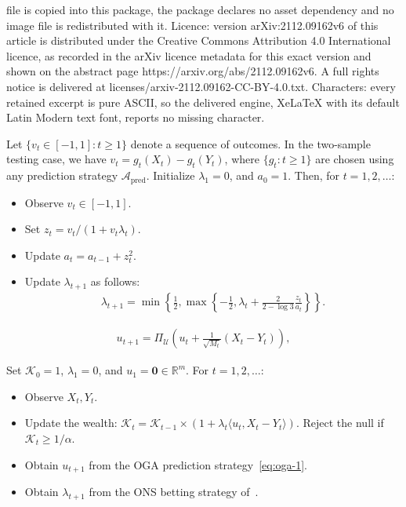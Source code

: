 \documentclass[10pt,a4paper]{amsart}
\newcommand*{\wealth}{\mathcal{K}}
\newcommand{\lp}{\left (} %
\newcommand{\mc}[1]{\mathcal{#1}}
\newcommand{\prediction}{\mc{A}_{\text{pred}}}
\newcommand{\rp}{\right )} %
\begin{document}
file is copied into this package, the package declares no asset dependency and no image file is redistributed with it. Licence: version arXiv:2112.09162v6 of this article is distributed under the Creative Commons Attribution 4.0 International licence, as recorded in the arXiv licence metadata for this exact version and shown on the abstract page https://arxiv.org/abs/2112.09162v6. A full rights notice is delivered at licenses/arxiv-2112.09162-CC-BY-4.0.txt. Characters: every retained excerpt is pure ASCII, so the delivered engine, XeLaTeX with its default Latin Modern text font, reports no missing character.
    \begin{definition}
        \label{def:ONS}
        Let $\{v_t \in [-1,1]: t \geq 1\}$ denote a sequence of outcomes. 
        In the two-sample testing case, we have $v_t = g_t(X_t) - g_t(Y_t)$, where $\{g_t: t \geq 1\}$ are chosen using any prediction strategy $\prediction$.
        Initialize $\lambda_1 = 0$, and $a_0=1$. Then, for $t=1, 2, \ldots:$
        \begin{itemize}
            \item Observe $v_t \in [-1,1]$. 
            \item Set $z_t = {v_t / (1 + v_t \lambda_t)}$. 
            \item Update $a_t = a_{t-1} + z_t^2$. 
            \item Update $\lambda_{t+1}$ as follows: 
            \begin{align}
                \label{def:lambda-ons}
                \lambda_{t+1} = \min \left\{\frac{1}{2}, \max \left\{ - \frac{1}{2}, {\lambda_t + \frac{2}{2-\log 3} \frac{z_t}{a_t} }\right\} \right\}. 
            \end{align}
        \end{itemize}
    \end{definition}

        \begin{align}
            \label{eq:oga-1}
            u_{t+1} =  \Pi_{\mc{U}} \lp u_{t} + \frac{1}{\sqrt{M_t}}\lp X_{t} - Y_{t} \rp \rp,
        \end{align}

        \begin{definition}
        \label{def:bounded-means-test}
            Set $\wealth_0 = 1$, $\lambda_1=0$, and $u_1=\boldsymbol{0} \in \mathbb{R}^m$. For $t=1, 2, \ldots$:
            \begin{itemize}
                \item Observe $X_t, Y_t$. 
                \item Update the wealth: $\wealth_{t} = \wealth_{t-1} \times \lp 1 + \lambda_t \langle u_t, X_t - Y_t \rangle \rp$. Reject the null if $\wealth_t \geq 1/\alpha$. 
                \item Obtain $u_{t+1}$ from the OGA prediction strategy~\eqref{eq:oga-1}. 
                \item Obtain $\lambda_{t+1}$ from the ONS betting strategy of~. 
            \end{itemize}
        \end{definition}
\end{document}
